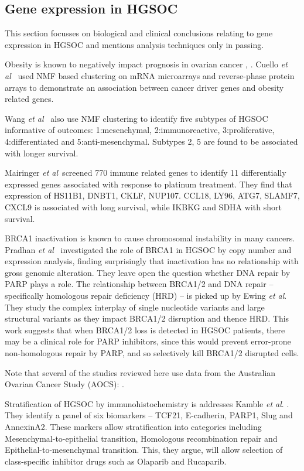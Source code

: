 \documentclass[draft, tikz, 12pt,a4paper,oneside,fleqn]{article}
\newcommand{\etal}{{\em et al\/}}
\begin{document}
\subsection{Gene expression in HGSOC}

This section focusses on biological and clinical conclusions relating to gene expression in HGSOC and mentions analysis techniques only in passing.

Obesity is known to negatively impact prognosis in ovarian cancer \cite{Cuello2018}, \cite{Au-Yeung2014}.  Cuello \etal\ \cite{Cuello2018} used NMF based clustering on mRNA microarrays and reverse-phase protein arrays to demonstrate an association between cancer driver genes and obesity related genes.

Wang \etal\ \cite{Wang2017c} also use NMF clustering to identify five subtypes of HGSOC informative of outcomes: 1:mesenchymal, 2:immunoreactive, 3:proliferative, 4:differentiated and 5:anti-mesenchymal.  Subtypes 2, 5 are found to be associated with longer survival.

Mairinger \etal\ screened 770 immune related genes to identify 11 differentially expressed genes associated with response to platinum treatment.  They find that expression of HS11B1, DNBT1, CKLF, NUP107. CCL18, LY96, ATG7, SLAMF7, CXCL9 is associated with long survival, while IKBKG and SDHA with short survival.

BRCA1 inactivation is known to cause chromosomal instability in many cancers.  Pradhan \etal\ \cite{Pradhan2010} investigated the role of BRCA1 in HGSOC by copy number and expression analysis, finding surprisingly that inactivation has no relationship with gross genomic alteration.  They leave open the question whether DNA repair by PARP plays a role.   The relationship between BRCA1/2 and DNA repair -- specifically homologous repair deficiency (HRD) -- is picked up by Ewing \etal \cite{Ewing2020}.  They study the complex interplay of single nucleotide variants and large structural variants as they impact BRCA1/2 disruption and thence HRD.  This work suggests that when BRCA1/2 loss is detected in HGSOC patients, there may be a clinical role for PARP inhibitors, since this would prevent error-prone non-homologous repair by PARP, and so selectively kill BRCA1/2 disrupted cells.

Note that several of the studies reviewed here use data from the Australian Ovarian Cancer Study (AOCS): \cite{Winterhoff2016,Patch2015,Ewing2020,Zhang2018,Cuello2018,Au-Yeung2014}.

Stratification of HGSOC by immunohistochemistry is addresses Kamble \etal. \cite{Kamble2019}.  They identify a panel of six biomarkers -- TCF21, E-cadherin, PARP1, Slug and AnnexinA2.   These markers allow stratification into categories including Mesenchymal-to-epithelial transition, Homologous recombination repair and Epithelial-to-mesenchymal transition.  This, they argue, will allow selection of class-specific inhibitor drugs such as Olaparib and Rucaparib.
\end{document}
